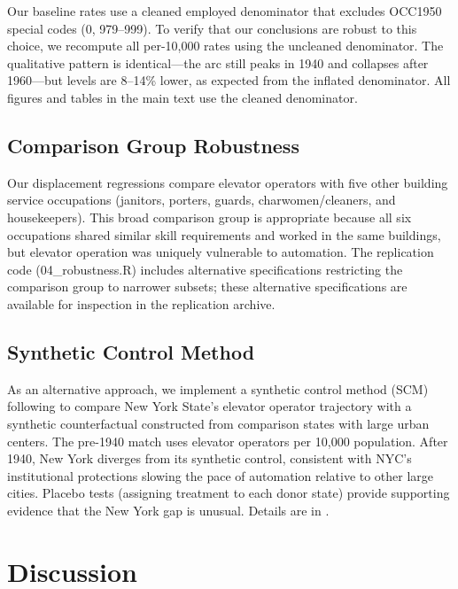 \documentclass[12pt]{article}
\begin{document}
Our baseline rates use a cleaned employed denominator that excludes OCC1950 special codes (0, 979--999). To verify that our conclusions are robust to this choice, we recompute all per-10,000 rates using the uncleaned denominator. The qualitative pattern is identical---the arc still peaks in 1940 and collapses after 1960---but levels are 8--14\% lower, as expected from the inflated denominator. All figures and tables in the main text use the cleaned denominator.

\subsection{Comparison Group Robustness}

Our displacement regressions compare elevator operators with five other building service occupations (janitors, porters, guards, charwomen/cleaners, and housekeepers). This broad comparison group is appropriate because all six occupations shared similar skill requirements and worked in the same buildings, but elevator operation was uniquely vulnerable to automation. The replication code (04\_robustness.R) includes alternative specifications restricting the comparison group to narrower subsets; these alternative specifications are available for inspection in the replication archive.

\subsection{Synthetic Control Method}

As an alternative approach, we implement a synthetic control method (SCM) following \citet{abadie2010} to compare New York State's elevator operator trajectory with a synthetic counterfactual constructed from comparison states with large urban centers. The pre-1940 match uses elevator operators per 10,000 population. After 1940, New York diverges from its synthetic control, consistent with NYC's institutional protections slowing the pace of automation relative to other large cities. Placebo tests (assigning treatment to each donor state) provide supporting evidence that the New York gap is unusual. Details are in .



\section{Discussion} \label{sec:discussion}
\end{document}
